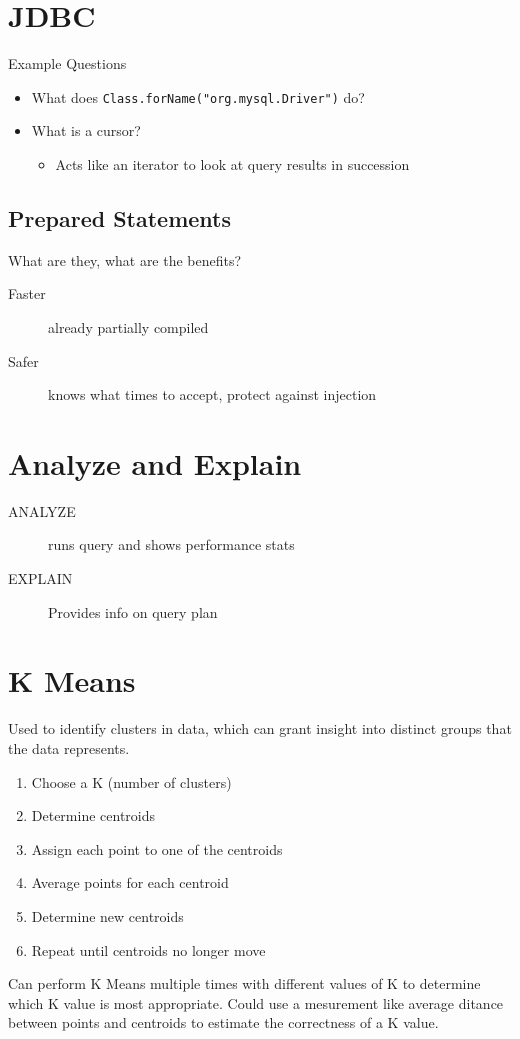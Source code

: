 \documentclass[12pt]{article}
\begin{document}
\section{JDBC}
Example Questions
\begin{itemize}
  \item {What does \lstinline{Class.forName("org.mysql.Driver")} do?}
  \item {What is a cursor?
    \begin{itemize}
      \item {Acts like an iterator to look at query results in succession}
    \end{itemize}}
\end{itemize}

\subsection{Prepared Statements}
What are they, what are the benefits?
\begin{description}
  \item [Faster] {already partially compiled}
  \item [Safer] {knows what times to accept, protect against injection}
\end{description}

\section{Analyze and Explain}
\begin{description}
  \item [ANALYZE] {runs query and shows performance stats}
  \item [EXPLAIN] {Provides info on query plan}
\end{description}

\section{K Means}
Used to identify clusters in data, which can grant insight into distinct groups
that the data represents.
\begin{enumerate}
  \item Choose a K (number of clusters)
  \item Determine centroids
  \item Assign each point to one of the centroids
  \item Average points for each centroid
  \item Determine new centroids
  \item Repeat until centroids no longer move
\end{enumerate}
Can perform K Means multiple times with different values of K to determine
which K value is most appropriate. Could use a mesurement like average ditance
between points and centroids to estimate the correctness of a K value.
\end{document}
